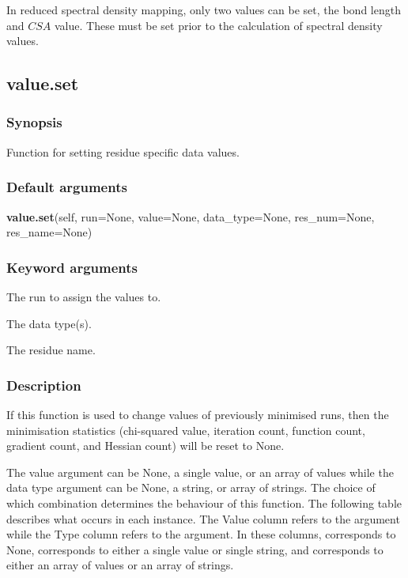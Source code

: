 In reduced spectral density mapping, only two values can be set, the bond length and $CSA$
value.  These must be set prior to the calculation of spectral density values.


\newpage

\subsection{value.set}


\subsubsection{Synopsis}

Function for setting residue specific data values.

\subsubsection{Default arguments}

\textsf{\textbf{value.set}(self, run=None, value=None, data\_type=None, res\_num=None, res\_name=None)}


\subsubsection{Keyword arguments}

  The run to assign the values to.

  The data type(s).

  The residue name.

\subsubsection{Description}

If this function is used to change values of previously minimised runs, then the
minimisation statistics (chi-squared value, iteration count, function count, gradient count,
and Hessian count) will be reset to None.


The value argument can be None, a single value, or an array of values while the data type
argument can be None, a string, or array of strings.  The choice of which combination
determines the behaviour of this function.  The following table describes what occurs in
each instance.  The Value column refers to the 
 argument while the Type column refers
to the 
 argument.  In these columns, 
 corresponds to None, 
 corresponds
to either a single value or single string, and 
 corresponds to either an array of values
or an array of strings.



